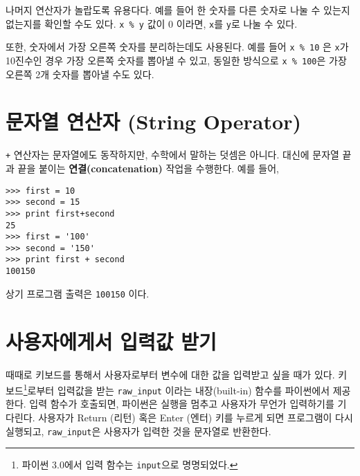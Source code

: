 나머지 연산자가 놀랍도록 유용다다. 예를 들어 한 숫자를 다른 숫자로 나눌 수 있는지 없는지를 확인할 수도 있다. 
{\tt x \% y} 값이 0 이라면, {\tt x}를 {\tt y}로 나눌 수 있다.


또한, 숫자에서 가장 오른쪽 숫자를 분리하는데도 사용된다. 
예를 들어 {\tt x \% 10} 은 {\tt x}가 10진수인 경우 가장 오른쪽 숫자를 뽑아낼 수 있고, 동일한 방식으로 {\tt x \% 100}은 가장 오른쪽 2개 숫자를 뽑아낼 수도 있다.

\section{문자열 연산자 (String Operator)}

{\tt +} 연산자는 문자열에도 동작하지만, 수학에서 말하는 덧셈은 아니다. 
대신에 문자열 끝과 끝을 붙이는 {\bf 연결(concatenation)} 작업을 수행한다. 예를 들어,


\beforeverb
\begin{verbatim}
>>> first = 10
>>> second = 15
>>> print first+second
25
>>> first = '100'
>>> second = '150'
>>> print first + second
100150
\end{verbatim}
\afterverb
%

상기 프로그램 출력은 {\tt 100150} 이다.

\section{사용자에게서 입력값 받기}


때때로 키보드를 통해서 사용자로부터 변수에 대한 값을 입력받고 싶을 때가 있다. 
키보드\footnote{파이썬 3.0에서 입력 함수는 {\tt input}으로 명명되었다.}로부터 입력값을 받는 \verb"raw_input" 이라는 내장(built-in) 함수를 파이썬에서 제공한다. 입력 함수가 호출되면, 파이썬은 실행을 멈추고 사용자가 무언가 입력하기를 기다린다. 
사용자가 {\sf Return (리턴)} 혹은 {\sf Enter (엔터)} 키를 누르게 되면 프로그램이 다시 실행되고, \verb"raw_input"은 사용자가 입력한 것을 문자열로 반환한다.


